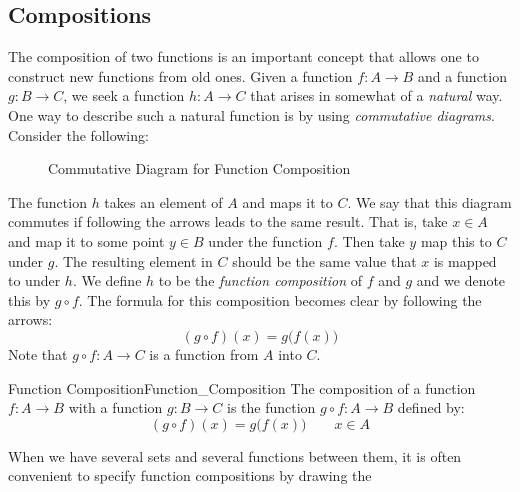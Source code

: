     \subsection{Compositions}
        The composition of two functions is an important concept that allows
        one to construct new functions from old ones. Given a function
        $f:A\rightarrow{B}$ and a function $g:B\rightarrow{C}$, we seek a
        function $h:A\rightarrow{C}$ that arises in somewhat of a
        \textit{natural} way. One way to describe such a natural function is
        by using \textit{commutative diagrams}.
        Consider the following:
        \begin{figure}[H]
            \centering
            \captionsetup{type=figure}
            
            \caption{Commutative Diagram for Function Composition}
            \label{fig:Commutative_Diagram_Func_Comp}
        \end{figure}
        The function $h$ takes an element of $A$ and maps it to $C$. We say that
        this diagram commutes if following the arrows leads to the same result.
        That is, take $x\in{A}$ and map it to some point $y\in{B}$ under the
        function $f$. Then take $y$ map this to $C$ under $g$. The resulting
        element in $C$ should be the same value that $x$ is mapped to under $h$.
        We define $h$ to be the
        \textit{function composition} of $f$ and
        $g$ and we denote this by $g\circ{f}$. The formula for this composition
        becomes clear by following the arrows:
        \begin{equation}
            (g\circ{f})(x)=g\big(f(x)\big)
        \end{equation}
        Note that $g\circ{f}:A\rightarrow{C}$ is a function from $A$ into $C$.
        \begin{fdefinition}{Function Composition}{Function_Composition}
            The composition of a function $f:A\rightarrow{B}$ with a function
            $g:B\rightarrow{C}$ is the function $g\circ{f}:A\rightarrow{B}$
            defined by:
            \begin{equation*}
                (g\circ{f})(x)=g\big(f(x)\big)
                \quad\quad
                x\in{A}
            \end{equation*}
        \end{fdefinition}
        When we have several sets and several functions between them, it is
        often convenient to specify function compositions by drawing the
